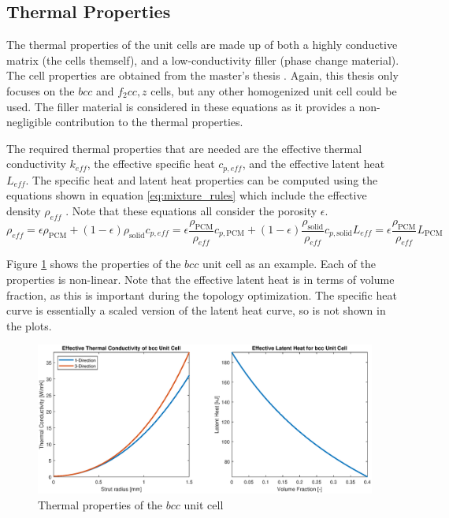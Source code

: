 \subsection*{Thermal Properties}
The thermal properties of the unit cells are made up of both a highly conductive matrix (the cells themself), and a low-conductivity filler (phase change material). The cell properties are obtained from the master's thesis \cite{Piacquadio_Soika_Schirp_Schröder_Filippeschi_2023}. Again, this thesis only focuses on the $bcc$ and $f_2 cc,z$ cells, but any other homogenized unit cell could be used. The filler material is considered in these equations as it provides a non-negligible contribution to the thermal properties.

The required thermal properties that are needed are the effective thermal conductivity $k_{eff}$, the effective specific heat $c_{p, eff}$, and the effective latent heat $L_{eff}$. The specific heat and latent heat properties can be computed using the equations shown in equation \ref{eq:mixture_rules} which include the effective density $\rho_{eff}$ \cite{Piacquadio_Schirp-Schoenen_Mameli_Filippeschi_Schröder_2022}. Note that these equations all consider the porosity $\epsilon$.
\begin{subequations}
    \begin{equation}
        \rho_{eff} = \epsilon\rho_{\text{PCM}} + (1 - \epsilon)\rho_{\text{solid}}
    \end{equation}
    \begin{equation}
        c_{p, eff} = \epsilon\frac{\rho_\text{PCM}}{\rho_{eff}}c_{p,\text{PCM}} + (1 - \epsilon)\frac{\rho_\text{solid}}{\rho_{eff}}c_{p, \text{solid}} 
    \end{equation}
    \begin{equation}
        L_{eff} = \epsilon\frac{\rho_\text{PCM}}{\rho_{eff}}L_\text{PCM}
    \end{equation}
    \label{eq:mixture_rules}
\end{subequations}

Figure \ref{fig:thermal_properties} shows the properties of the $bcc$ unit cell as an example. Each of the properties is non-linear. Note that the effective latent heat is in terms of volume fraction, as this is important during the topology optimization. The specific heat curve is essentially a scaled version of the latent heat curve, so is not shown in the plots.
\begin{figure}[ht]
    \centering
    \includegraphics[width=0.95\linewidth]{figures/chapter_3/ThermalProperties.eps}
    \caption{Thermal properties of the $bcc$ unit cell}
    \label{fig:thermal_properties}
\end{figure}


